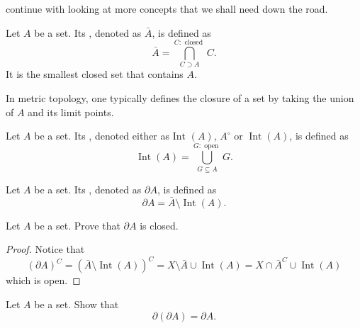 \documentclass[notoc,notitlepage]{tufte-book}
\DeclareMathOperator{\Int}{Int}
\begin{document}
 continue with looking at
more concepts that we shall need down the road.

\begin{defn}\label{defn:closure_of_a_set}
  Let $A$ be a set. Its ,
  denoted as $\bar{A}$, is defined as
  \begin{equation*}
    \bar{A} = \bigcap_{C \supset A}^{C: \text{ closed }} C.
  \end{equation*}
  It is the smallest closed set that contains $A$.
\end{defn}

\begin{note}
  In metric topology, one typically defines the closure of a set by taking the union of $A$ and its limit points.
\end{note}

\begin{defn}\label{defn:interior_of_a_set}
  Let $A$ be a set. Its ,
  denoted either as $\text{Int }(A)$, $A^\circ$ or $\Int(A)$,
  is defined as
  \begin{equation*}
    \Int(A) = \bigcup_{G \subseteq A}^{G: \text{ open }} G.
  \end{equation*}
\end{defn}

\begin{defn}\label{defn:boundary_of_a_set}
  Let $A$ be a set. Its ,
  denoted as $\partial A$, is defined as
  \begin{equation*}
    \partial A = \bar{A} \setminus \Int(A).
  \end{equation*}
\end{defn}

\begin{ex}
  Let $A$ be a set. Prove that $\partial A$ is closed.
\end{ex}

\begin{proof}
  Notice that
  \begin{equation*}
    ( \partial A )^C = ( \bar{A} \setminus \Int(A) )^C = X \setminus \bar{A} \cup \Int(A) = X \cap \bar{A}^C \cup \Int(A)
  \end{equation*}
  which is open.
\end{proof}

\begin{ex}
  Let $A$ be a set. Show that
  \begin{equation*}
    \partial ( \partial A ) = \partial A.
  \end{equation*}
\end{ex}
\end{document}
